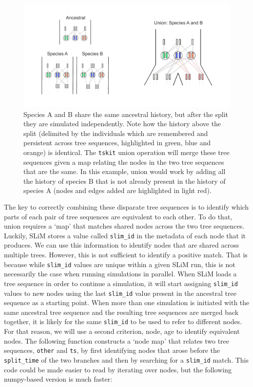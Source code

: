 \documentclass[12pt]{article}
\newcommand{\tskit}[0]{\texttt{tskit}\xspace}
\begin{document}
\begin{figure}[h!]
    \centering
     \includegraphics[width=\textwidth]{./figures/union.pdf}
     \caption{Species A and B share the same ancestral history, but after the split they are simulated independently. Note how the history above the split (delimited by the individuals which are remembered and persistent across tree sequences, highlighted in green, blue and orange) is identical. The \tskit union operation will merge these tree sequences given a map relating the nodes in the two tree sequences that are the same. In this example, union would work by adding all the history of species B that is not already present in the history of species A (nodes and edges added are highlighted in light red).}
     \label{fig:union}
    \end{figure}

The key to correctly combining these disparate tree sequences is to identify which parts of each pair of tree sequences are equivalent to each other. To do that, union requires
a `map' that matches shared nodes across the two tree sequences. Luckily, SLiM stores a value called \verb|slim_id| in the metadata of each node that it produces. We can use this
information to identify nodes that are shared across multiple trees. However, this is not sufficient to identify a positive match. That is because while \verb|slim_id| values are unique
within a given SLiM run, this is not necessarily the case when running simulations in parallel. When SLiM loads a tree sequence in order to continue a simulation, it will start assigning
\verb|slim_id| values to new nodes using the last \verb|slim_id| value present in the ancestral tree sequence as a starting point. When more than one simulation is initiated with the same
ancestral tree sequence and the resulting tree sequences are merged back together, it is likely for the same \verb|slim_id| to be used to refer to different nodes. For that reason, we
will use a second criterion, node, age to identify equivalent nodes. The following function constructs a `node map' that relates two tree sequences, \verb|other| and \verb|ts|, by
first identifying nodes that arose before the \verb|split_time| of the two branches and then by searching for a \verb|slim_id| match. This code could be made easier to read by iterating
over nodes, but the following numpy-based version is much faster:
\end{document}
